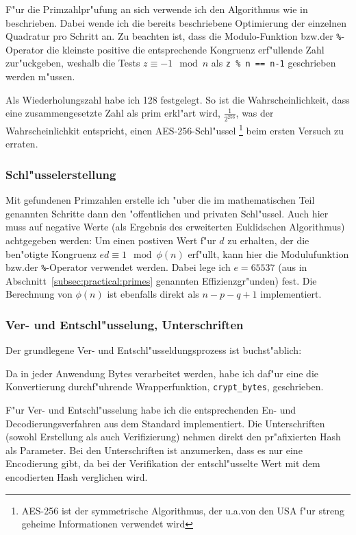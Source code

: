 \documentclass[12pt]{article}
\begin{document}
F"ur die Primzahlpr"ufung an sich verwende ich den Algorithmus wie in~\cite{hac} beschrieben.
Dabei wende ich die bereits beschriebene Optimierung der einzelnen Quadratur pro Schritt an.
Zu beachten ist, dass die Modulo-Funktion bzw.\@ der \verb|%|-Operator
die kleinste positive die entsprechende Kongruenz erf"ullende Zahl zur"uckgeben,
weshalb die Tests $z \equiv -1 \mod n$ als \verb|z % n == n-1| geschrieben werden m"ussen.

Als Wiederholungszahl habe ich 128 festgelegt.
So ist die Wahrscheinlichkeit, dass eine zusammengesetzte Zahl als prim erkl"art wird,
$\frac{1}{2^{256}}$, was der Wahrscheinlichkit entspricht, einen AES-256-Schl"ussel%
\footnote{AES-256 ist der symmetrische Algorithmus,
der u.a.\@ von den USA f"ur streng geheime Informationen verwendet wird}
beim ersten Versuch zu erraten.

\subsubsection{Schl"usselerstellung}
Mit gefundenen Primzahlen erstelle ich "uber die im mathematischen Teil genannten Schritte
dann den "offentlichen und privaten Schl"ussel.
Auch hier muss auf negative Werte (als Ergebnis des erweiterten Euklidschen Algorithmus)
achtgegeben werden: Um einen postiven Wert f"ur $d$ zu erhalten, der die ben"otigte Kongruenz
$ed \equiv 1 \mod \phi(n)$ erf"ullt, kann hier die Modulufunktion bzw.\@ der \verb|%|-Operator
verwendet werden.
Dabei lege ich $e = 65537$ (aus in Abschnitt~\ref{subsec:practical:primes} genannten Effizienzgr"unden) fest.
Die Berechnung von $\phi(n)$ ist ebenfalls direkt als $n - p - q + 1$ implementiert.

\subsubsection{Ver- und Entschl"usselung, Unterschriften}
Der grundlegene Ver- und Entschl"usseldungsprozess ist buchst"ablich:

Da in jeder Anwendung Bytes verarbeitet werden, habe ich daf"ur eine die Konvertierung
durchf"uhrende Wrapperfunktion, \lstinline{crypt_bytes}, geschrieben.

F"ur Ver- und Entschl"usselung habe ich die entsprechenden En- und De\-codie\-rungs\-ver\-fah\-ren
aus dem Standard implementiert.
Die Unterschriften (sowohl Erstellung als auch Verifizierung) nehmen direkt den
pr"afixierten Hash als Parameter.
Bei den Unterschriften ist anzumerken, dass es nur eine Encodierung gibt,
da bei der Verifikation der entschl"usselte Wert mit dem encodierten Hash verglichen wird.
\end{document}
